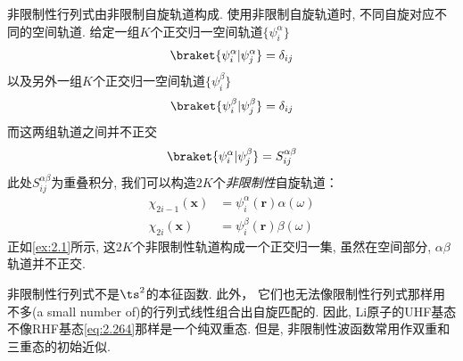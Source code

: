 非限制性行列式由非限制自旋轨道构成. 
使用非限制自旋轨道时, 
不同自旋对应不同的空间轨道. 
给定一组$K$个正交归一空间轨道$\{\psi_i^\alpha\}$
\begin{align}
\braket{\psi_i^\alpha|\psi_j^\alpha}=\delta_{ij}
\end{align}
以及另外一组$K$个正交归一空间轨道$\{\psi_i^\beta\}$
\begin{align}
\braket{\psi_i^\beta|\psi_j^\beta}=\delta_{ij}
\end{align}
而这两组轨道之间并不正交
\begin{align}
\braket{\psi_i^\alpha|\psi_j^\beta}=S_{ij}^{\alpha\beta}
\end{align}
此处$S_{ij}^{\alpha\beta}$为重叠积分, 
我们可以构造$2K$个\emph{非限制性}自旋轨道：
\begin{equation}
\begin{split}
\chi_{2i-1}(\mathbf{x}) &= \psi_i^\alpha(\mathbf{r})\alpha(\omega)\\
\chi_{2i}(\mathbf{x})   &= \psi_i^\beta(\mathbf{r})\beta(\omega) 
\end{split}
\end{equation}
正如\autoref{ex:2.1}所示, 
这$2K$个非限制性轨道构成一个正交归一集, 
虽然在空间部分, 
$\alpha$$\beta$轨道并不正交.


非限制性行列式不是$\ts^2$的本征函数. 
此外， 
它们也无法像限制性行列式那样用不多(a small number of)的行列式线性组合出自旋匹配的. 
因此, 
Li原子的UHF基态不像RHF基态\autoref{eq:2.264}那样是一个纯双重态. 
但是, 
非限制性波函数常用作双重和三重态的初始近似. 

